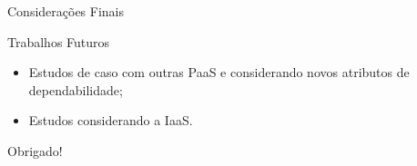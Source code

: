 \documentclass{beamer}
\begin{document}
    \begin{frame}{Considerações Finais}

        Trabalhos Futuros
        \begin{itemize}
        \item Estudos de caso com outras PaaS e considerando novos atributos de dependabilidade;
        \medskip
        \item Estudos considerando a IaaS.
        \end{itemize}

    \end{frame}
    
    \begin{frame}{}
        \Huge{\centerline{Obrigado!}}
    \end{frame}
\end{document}
